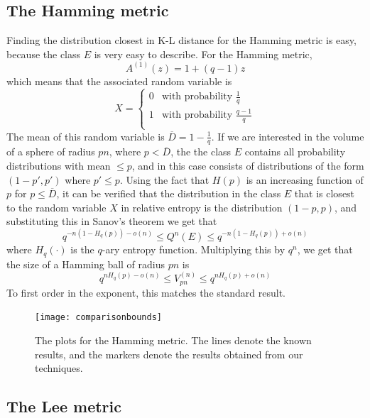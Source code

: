 \documentclass[conference,letterpaper]{IEEEtran}
\begin{document}
\subsection{The Hamming metric}\label{hamming example}
Finding the distribution closest in K-L distance for the Hamming metric is easy, because the class $E$ is very easy to describe. For the Hamming metric, 
\begin{equation}
    A^{(1)}(z) = 1 + (q-1)z
\end{equation}
which means that the associated random variable is 
\begin{equation}
    X = \begin{cases}
        0 & \text{with probability $\frac{1}{q}$} \\
        1 & \text{with probability $\frac{q-1}{q}$} \\
            \end{cases}
\end{equation}
The mean of this random variable is $\overline{D} = 1 - \frac{1}{q}$. If we are interested in the volume of a sphere of radius $pn$, where $p < \overline{D}$, the the class $E$ contains all probability distributions with mean $\leq p$, and in this case consists of distributions of the form $(1-p', p')$ where $p' \leq p$. Using the fact that $H(p)$ is an increasing function of $p$ for $p \leq \overline{D}$, it can be verified \cite{Cover:2006:EIT:1146355} that the distribution in the class $E$ that is closest to the random variable $X$ in relative entropy is the distribution $(1-p, p)$, and substituting this in Sanov's theorem we get that 
\begin{equation}
    q^{-n(1 - H_q(p)) - o(n)} \leq Q^n(E) \leq q^{-n(1 - H_q(p)) + o(n)}
\end{equation}
where $H_q(\cdot)$ is the $q$-ary entropy function. Multiplying this by $q^n$, we get that the size of a Hamming ball of radius $pn$ is 
\begin{equation}
    q^{nH_q(p) - o(n)} \leq V_{pn}^{(n)} \leq q^{nH_q(p) + o(n)}
\end{equation}
To first order in the exponent, this matches the standard result\cite{Roth:2006:ICT:1137784}. 
\begin{figure}[htbp]
    \centering
    \texttt{[image: comparisonbounds]}
    \caption{The plots for the Hamming metric. The lines denote the known results, and the markers denote the results obtained from our techniques.}
\end{figure}
\subsection{The Lee metric} \label{lee metric}
\end{document}
